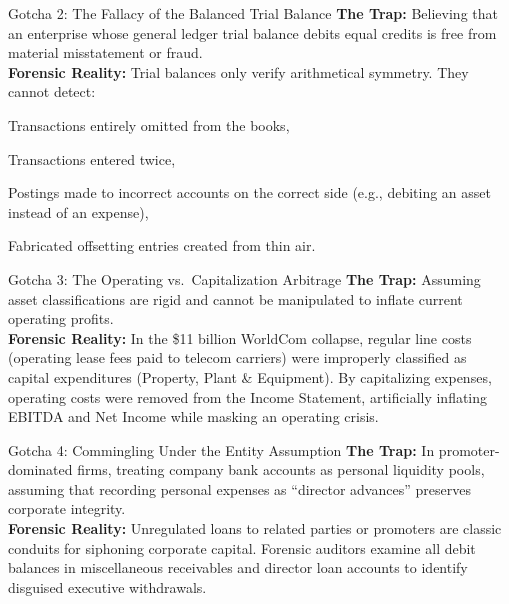 \begin{trapbox}{Gotcha 2: The Fallacy of the Balanced Trial Balance}
\textbf{The Trap:} Believing that an enterprise whose general ledger trial balance debits equal credits is free from material misstatement or fraud.\\
\textbf{Forensic Reality:} Trial balances only verify arithmetical symmetry. They cannot detect:
\begin{enumerate*}[label=(\roman*)]
    \item Transactions entirely omitted from the books,
    \item Transactions entered twice,
    \item Postings made to incorrect accounts on the correct side (e.g., debiting an asset instead of an expense),
    \item Fabricated offsetting entries created from thin air.
\end{enumerate*}
\end{trapbox}

\begin{trapbox}{Gotcha 3: The Operating vs.~Capitalization Arbitrage}
\textbf{The Trap:} Assuming asset classifications are rigid and cannot be manipulated to inflate current operating profits.\\
\textbf{Forensic Reality:} In the \$11 billion WorldCom collapse, regular line costs (operating lease fees paid to telecom carriers) were improperly classified as capital expenditures (Property, Plant \& Equipment). By capitalizing expenses, operating costs were removed from the Income Statement, artificially inflating EBITDA and Net Income while masking an operating crisis.
\end{trapbox}

\begin{trapbox}{Gotcha 4: Commingling Under the Entity Assumption}
\textbf{The Trap:} In promoter-dominated firms, treating company bank accounts as personal liquidity pools, assuming that recording personal expenses as ``director advances'' preserves corporate integrity.\\
\textbf{Forensic Reality:} Unregulated loans to related parties or promoters are classic conduits for siphoning corporate capital. Forensic auditors examine all debit balances in miscellaneous receivables and director loan accounts to identify disguised executive withdrawals.
\end{trapbox}

